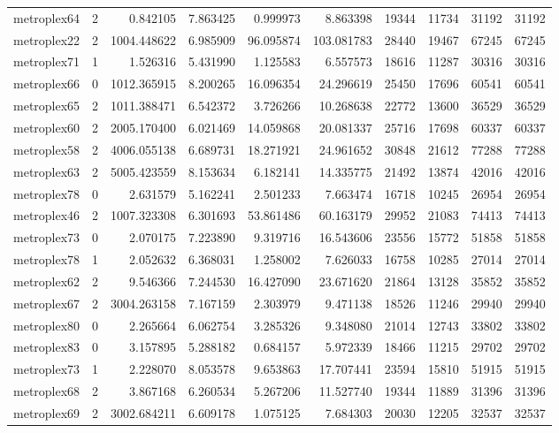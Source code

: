 \begin{longtable}{|l|r|r|r|r|r|r|r|r|r|}
metroplex64 & 2 & 0.842105 & 7.863425 & 0.999973 & 8.863398 & 19344 & 11734 & 31192 & 31192 \\
metroplex22 & 2 & 1004.448622 & 6.985909 & 96.095874 & 103.081783 & 28440 & 19467 & 67245 & 67245 \\
metroplex71 & 1 & 1.526316 & 5.431990 & 1.125583 & 6.557573 & 18616 & 11287 & 30316 & 30316 \\
metroplex66 & 0 & 1012.365915 & 8.200265 & 16.096354 & 24.296619 & 25450 & 17696 & 60541 & 60541 \\
metroplex65 & 2 & 1011.388471 & 6.542372 & 3.726266 & 10.268638 & 22772 & 13600 & 36529 & 36529 \\
metroplex60 & 2 & 2005.170400 & 6.021469 & 14.059868 & 20.081337 & 25716 & 17698 & 60337 & 60337 \\
metroplex58 & 2 & 4006.055138 & 6.689731 & 18.271921 & 24.961652 & 30848 & 21612 & 77288 & 77288 \\
metroplex63 & 2 & 5005.423559 & 8.153634 & 6.182141 & 14.335775 & 21492 & 13874 & 42016 & 42016 \\
metroplex78 & 0 & 2.631579 & 5.162241 & 2.501233 & 7.663474 & 16718 & 10245 & 26954 & 26954 \\
metroplex46 & 2 & 1007.323308 & 6.301693 & 53.861486 & 60.163179 & 29952 & 21083 & 74413 & 74413 \\
metroplex73 & 0 & 2.070175 & 7.223890 & 9.319716 & 16.543606 & 23556 & 15772 & 51858 & 51858 \\
metroplex78 & 1 & 2.052632 & 6.368031 & 1.258002 & 7.626033 & 16758 & 10285 & 27014 & 27014 \\
metroplex62 & 2 & 9.546366 & 7.244530 & 16.427090 & 23.671620 & 21864 & 13128 & 35852 & 35852 \\
metroplex67 & 2 & 3004.263158 & 7.167159 & 2.303979 & 9.471138 & 18526 & 11246 & 29940 & 29940 \\
metroplex80 & 0 & 2.265664 & 6.062754 & 3.285326 & 9.348080 & 21014 & 12743 & 33802 & 33802 \\
metroplex83 & 0 & 3.157895 & 5.288182 & 0.684157 & 5.972339 & 18466 & 11215 & 29702 & 29702 \\
metroplex73 & 1 & 2.228070 & 8.053578 & 9.653863 & 17.707441 & 23594 & 15810 & 51915 & 51915 \\
metroplex68 & 2 & 3.867168 & 6.260534 & 5.267206 & 11.527740 & 19344 & 11889 & 31396 & 31396 \\
metroplex69 & 2 & 3002.684211 & 6.609178 & 1.075125 & 7.684303 & 20030 & 12205 & 32537 & 32537 \\

\end{longtable}
